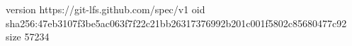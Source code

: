 version https://git-lfs.github.com/spec/v1
oid sha256:47eb3107f3be5ac063f7f22c21bb26317376992b201c001f5802c85680477c92
size 57234
